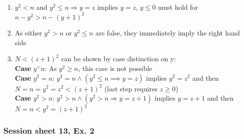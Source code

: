 \documentclass{article}
\begin{document}
\begin{enumerate}[label=(\arabic*)]
    \item $y^2<n$ and $y^2 \leq n \Rightarrow y = z$ implies $y=z$, $y \leq 0$ must hold for $n-y^2 > n-(y+1)^2$
    \item As either $y^2>n$ or $y^2\leq n$ are false, they immediately imply the right hand side
    \item $N < (z+1)^2$ can be shown by case distinction on y: \\
    \textbf{Case} $y^<n$: As $y^2\geq n$, this case is not possible \\
    \textbf{Case} $y^2=n$: $y^2 = n \land (y^2 \leq n \implies y=z)$ implies $y^2=z^2$ and then $N=n=y^2 = z^2 < (z+1)^2$ (last step requires $z \geq 0$)\\
    \textbf{Case} $y^2 > n$: $y^2 > n \land (y^2 >n \Rightarrow y = z+1)$ implies $y = z+1$ and then 
    $N=n < y^2 = (z+1)^2$
\end{enumerate}

\subsubsection{Session sheet 13, Ex. 2}
\end{document}
